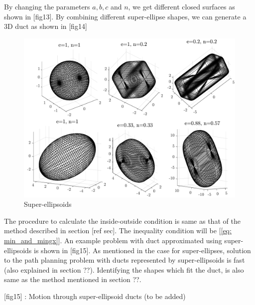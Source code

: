 \documentclass[12pt,a4]{article}
\begin{document}
By changing the parameters $a,b,c$ and $n$, we get different closed surfaces as shown in [fig13]. By combining different super-ellipse shapes, we can generate a 3D duct as shown in [fig14]

\begin{figure}[h!]
\centering
\includegraphics[scale=0.5]{figures/fig13.pdf}
\caption{ Super-ellipsoids \label{fig:SEs}}
\end{figure}

The procedure to calculate the inside-outside condition is same as that of the method described in section [ref sec]. The inequality condition will be [\ref{eq: min_and_mingx}]. An example problem with duct approximated using super-ellipsoids is shown in [fig15]. As mentioned in the case for super-ellipses, solution to the path planning problem with ducts represented by super-ellipsoids is fast (also explained in section ??). Identifying the shapes which fit the duct, is also same as the method mentioned in section ??. 

[fig15] : Motion through super-ellipsoid ducts (to be added)
\end{document}

